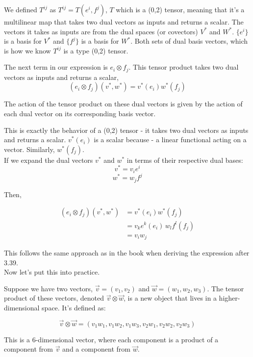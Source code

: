 We defined $T^{i j}$ as $T^{i j} = T(e^i, f^j)$, $T$ which is a (0,2) tensor,
meaning that it's a multilinear map that takes two dual vectors as inputs and returns a scalar.
The vectors it takes as inputs are from the dual spaces (or covectors) $V^*$ and $W^*$.
$\{e^i\}$ is a basis for $V^*$ and $\{f^j\}$ is a basis for $W^*$.
Both sets of dual basis vectors, which is how we know $T^{ij}$ is a type (0,2) tensor.



The next term in our expression is $e_i \otimes f_j$.
This tensor product takes two dual vectors as inputs and returns a scalar,
$$
(e_i \otimes f_j)(v^*, w^*) = v^*(e_i) w^*(f_j)
$$

The action of the tensor product on these dual vectors is given by the action of each dual vector on its
corresponding basis vector.

This is exactly the behavior of a (0,2) tensor - it takes two dual vectors as inputs and returns a scalar.
$v^*(e_i)$ is a scalar because - a linear functional acting on a vector. Similarly,
$w^*(f_j)$.
\\

If we expand the dual vectors $v^*$ and $w^*$ in terms of their respective dual bases:
$$
v^* = v_i e^i
$$
$$
w^* = w_j f^j
$$

Then,

\begin{align*}
(e_i \otimes f_j)(v^*, w^*) &= v^*(e_i) w^*(f_j) \\
&= v_k e^k(e_i) \, w_l f^l(f_j) \\
&= v_i w_j
\end{align*}

This follows the same approach as in the book when deriving the expression after 3.39.
\\






Now let's put this into practice.


Suppose we have two vectors, $\vec{v} = (v_1, v_2)$ and $\vec{w} = (w_1, w_2, w_3)$.
The tensor product of these vectors, denoted $\vec{v} \otimes \vec{w}$,
is a new object that lives in a higher-dimensional space. It's defined as:

$$
\vec{v} \otimes \vec{w} = (v_1 w_1, v_1 w_2, v_1 w_3, v_2 w_1, v_2 w_2, v_2 w_3)
$$

This is a 6-dimensional vector, where each component is a product of a component from
$\vec{v}$ and a component from $\vec{w}$.

